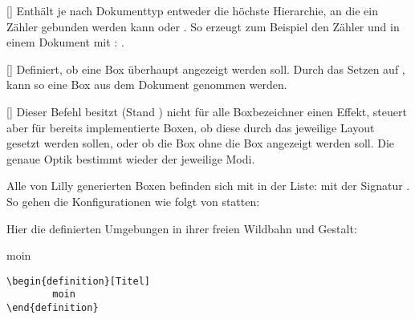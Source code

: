 %
%
%

[]
Enthält je nach Dokumenttyp entweder die höchste Hierarchie, an die ein Zähler gebunden werden kann oder \T{\true}. So erzeugt \T{\true} zum Beispiel den Zähler  und  in einem Dokument mit : .

%
%
%

[]
Definiert, ob eine Box überhaupt angezeigt werden soll. Durch das Setzen auf \T{\false}, kann so eine Box aus dem Dokument genommen werden.

%
%
%

[]
Dieser Befehl besitzt (Stand ) nicht für alle Boxbezeichner einen Effekt, steuert aber für bereits implementierte Boxen, ob diese durch das jeweilige Layout gesetzt werden sollen, oder ob die Box ohne die Box angezeigt werden soll. Die genaue Optik bestimmt wieder der jeweilige Modi.\newline

\begin{bemerkung}
    Alle von Lilly generierten Boxen befinden sich mit  in der Liste:  mit der Signatur . So gehen die Konfigurationen wie folgt von statten:
\end{bemerkung}

Hier die definierten Umgebungen in ihrer freien Wildbahn und Gestalt:

%

\begingroup\begin{definition}[Titel]
moin
\begin{lstlisting}[language=lLatex]
\begin{definition}[Titel]
        moin
\end{definition}\end{lstlisting}
\end{definition}\endgroup

